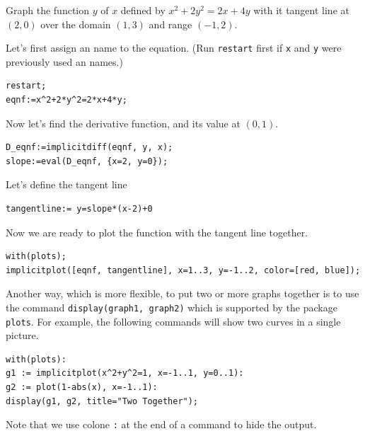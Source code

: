\documentclass[
  en,11pt,simple]{elegantbook}
\renewenvironment{example}[1][]{
  \refstepcounter{exam}
  \par\noindent\textbf{\color{main}{\examplename} \theexam #1}
  \rmfamily
}{
  \par\ignorespacesafterend
}
\begin{document}
\begin{example}

Graph the function \(y\) of \(x\) defined by \(x^2+2y^2=2x+4y\) with it tangent line at \((2, 0)\) over the domain \((1, 3)\) and range \((-1, 2)\).
\end{example}

\begin{solution}
{}
Let's first assign an name to the equation. (Run \texttt{restart} first if \texttt{x} and \texttt{y} were previously used an names.)

\begin{verbatim}
restart;
eqnf:=x^2+2*y^2=2*x+4*y;
\end{verbatim}

Now let's find the derivative function, and its value at \((0, 1)\).

\begin{verbatim}
D_eqnf:=implicitdiff(eqnf, y, x);
slope:=eval(D_eqnf, {x=2, y=0});
\end{verbatim}

Let's define the tangent line

\begin{verbatim}
tangentline:= y=slope*(x-2)+0
\end{verbatim}

Now we are ready to plot the function with the tangent line together.

\begin{verbatim}
with(plots);
implicitplot([eqnf, tangentline], x=1..3, y=-1..2, color=[red, blue]);
\end{verbatim}
\end{solution}

\begin{remark}
{}
Another way, which is more flexible, to put two or more graphs together is to use the command \texttt{display(graph1,\ graph2)} which is supported by the package \texttt{plots}. For example, the following commands will show two curves in a single picture.

\begin{verbatim}
with(plots):
g1 := implicitplot(x^2+y^2=1, x=-1..1, y=0..1):
g2 := plot(1-abs(x), x=-1..1):
display(g1, g2, title="Two Together");
\end{verbatim}

Note that we use colone \texttt{:} at the end of a command to hide the output.
\end{remark}
\end{document}
